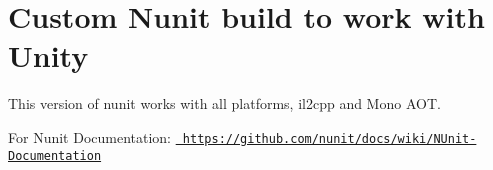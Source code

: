 \chapter{Custom Nunit build to work with Unity}
\hypertarget{md__hey_tea_9_2_library_2_package_cache_2com_8unity_8ext_8nunit_0d1_80_86_2_documentation_0i_2ext_8nunit}{}\label{md__hey_tea_9_2_library_2_package_cache_2com_8unity_8ext_8nunit_0d1_80_86_2_documentation_0i_2ext_8nunit}
\label{md__hey_tea_9_2_library_2_package_cache_2com_8unity_8ext_8nunit_0d1_80_86_2_documentation_0i_2ext_8nunit_autotoc_md909}%
%
 This version of nunit works with all platforms, il2cpp and Mono AOT.

For Nunit Documentation\+: \href{https://github.com/nunit/docs/wiki/NUnit-Documentation}{\texttt{ https\+://github.\+com/nunit/docs/wiki/\+NUnit-\/\+Documentation}} 